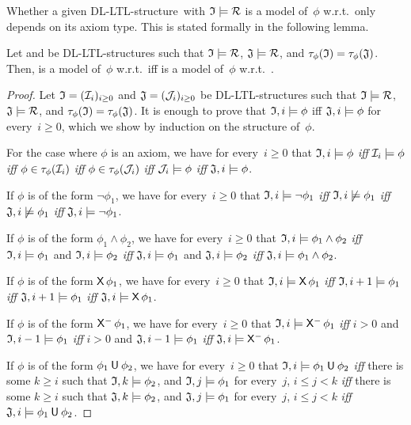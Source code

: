 Whether a given DL-LTL-structure~\Imf with $\mathfrak{I}\models\mathcal{R}$ is a model
of~$\phi$ w.r.t.~\Rmc only depends on its axiom type.  This is stated formally
in the following lemma.

\begin{lemma}\label{lem:equal-type}
    Let \Imf and \Jmf be DL-LTL-structures such that $\mathfrak{I}\models\mathcal{R}$,
    $\mathfrak{J}\models\mathcal{R}$, and $\tau_\phi(\mathfrak{I})=\tau_\phi(\mathfrak{J})$.  Then, \Imf is a
    model of~$\phi$ w.r.t.~\Rmc iff \Jmf is a model of~$\phi$ w.r.t.~\Rmc.
\end{lemma}

\begin{proof}
    Let $\mathfrak{I}=(\mathcal{I}_i)_{i\ge 0}$ and $\mathfrak{J}=(\mathcal{J}_i)_{i\ge 0}$ be
    DL-LTL-structures such that $\mathfrak{I}\models\mathcal{R}$, $\mathfrak{J}\models\mathcal{R}$, and
    $\tau_\phi(\mathfrak{I})=\tau_\phi(\mathfrak{J})$.  It is enough to
    prove that $\mathfrak{I},i\models\phi$ iff $\mathfrak{J},i\models\phi$ for every~$i\ge 0$,
    which we show by induction on the structure of~$\phi$.

    For the case where $\phi$ is an axiom, we have for every~$i\ge 0$ that
    $\mathfrak{I},i\models\phi$ \emph{iff} $\mathcal{I}_i\models\phi$ \emph{iff}
    $\phi\in\tau_\phi(\mathcal{I}_i)$ \emph{iff} $\phi\in\tau_\phi(\mathcal{J}_i)$ \emph{iff}
    $\mathcal{J}_i\models\phi$ \emph{iff} $\mathfrak{J},i\models\phi$.

    If $\phi$ is of the form $\lnot\phi_1$, we have for every~$i\ge 0$ that
    $\mathfrak{I},i\models\lnot\phi_1$ \emph{iff} $\mathfrak{I},i\not\models\phi_1$ \emph{iff}
    $\mathfrak{J},i\not\models\phi_1$ \emph{iff} $\mathfrak{J},i\models\lnot\phi_1$.

    If $\phi$ is of the form $\phi_1\land\phi_2$, we have for every~$i\ge 0$
    that $\mathfrak{I},i\models\phi_1\land\phi_2$ \emph{iff} $\mathfrak{I},i\models\phi_1$ and
    $\mathfrak{I},i\models\phi_2$ \emph{iff} $\mathfrak{J},i\models\phi_1$ and
    $\mathfrak{J},i\models\phi_2$ \emph{iff} $\mathfrak{J},i\models\phi_1\land\phi_2$.

    If $\phi$ is of the form $\operatorname{\mathsf{X}}\phi_1$, we have for every~$i\ge 0$ that
    $\mathfrak{I},i\models\operatorname{\mathsf{X}}\phi_1$ \emph{iff} $\mathfrak{I},i+1\models\phi_1$ \emph{iff}
    $\mathfrak{J},i+1\models\phi_1$ \emph{iff} $\mathfrak{J},i\models\operatorname{\mathsf{X}}\phi_1$.

    If $\phi$ is of the form $\Previous\phi_1$, we have for every~$i\ge 0$ that
    $\Imf,i\models\Previous\phi_1$ \emph{iff} $i>0$ and $\mathfrak{I},i-1\models\phi_1$
    \emph{iff} $i>0$ and $\mathfrak{J},i-1\models\phi_1$ \emph{iff}
    $\Jmf,i\models\Previous\phi_1$.

    If $\phi$ is of the form $\phi_1\mathbin{\mathsf{U}}\phi_2$, we have for every~$i\ge 0$
    that $\mathfrak{I},i\models\phi_1\mathbin{\mathsf{U}}\phi_2$ \emph{iff} there is some $k\ge i$
    such that $\mathfrak{I},k\models\phi_2$, and $\mathfrak{I},j\models\phi_1$ for every~$j$,
    $i\le j<k$ \emph{iff} there is some $k\ge i$ such that
    $\mathfrak{J},k\models\phi_2$, and $\mathfrak{J},j\models\phi_1$ for every~$j$, $i\le j<k$
    \emph{iff} $\mathfrak{J},i\models\phi_1\mathbin{\mathsf{U}}\phi_2$.


\end{proof}

